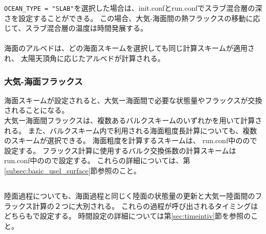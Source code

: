 \vspace{\baselineskip}
\verb|OCEAN_TYPE = "SLAB"|を選択した場合は、init.confとrun.confでスラブ混合層の深さを設定することができる。
この場合、大気-海面間の熱フラックスの移動に応じて、スラブ混合層の温度は時間発展する。\\

\\

海面のアルベドは、どの海面スキームを選択しても同じ計算スキームが適用され、
太陽天頂角に応じたアルベドが計算される。\\


\subsubsection{大気-海面フラックス}
海面スキームが設定されると、大気ー海面間で必要な状態量やフラックスが交換されることになる。\\
大気ー海面間フラックスは、複数あるバルクスキームのいずれかを用いて計算される。
また、バルクスキーム内で利用される海面粗度長計算についても、複数のスキームが選択できる。
海面粗度を計算するスキームは、
run.conf中のので設定する。
フラックス計算に使用するバルク交換係数の計算スキームは
run.conf中のので設定する。
これらの詳細については、第\ref{subsec:basic_usel_surface}節参照のこと。\\



\subsection{\SubsecLandSetting} \label{subsec:basic_usel_land}
陸面過程についても、海面過程と同じく陸面の状態量の更新と大気ー陸面間のフラックス計算の２つに大別される。
これらの過程が呼び出されるタイミングはどちらもで設定する。
時間設定の詳細については第\ref{sec:timeintiv}節を参照のこと。\\


